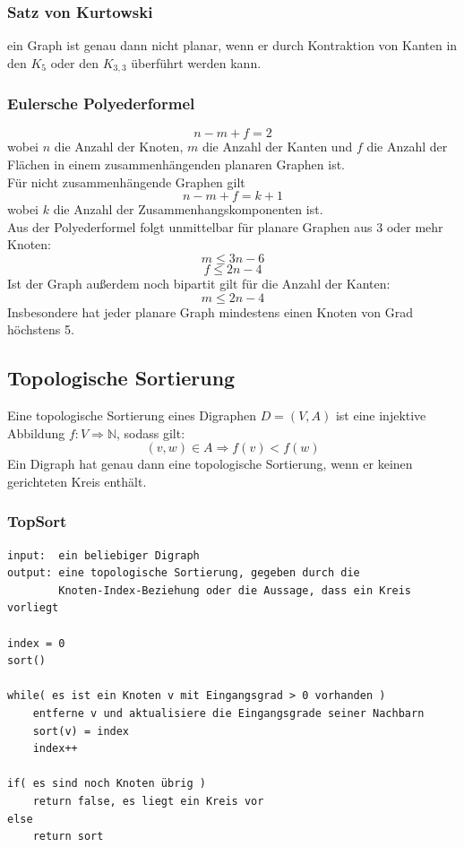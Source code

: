 \documentclass[10pt,a4paper,landscape]{article}
\begin{document}
\begin{multicols*}{2}
    \subsubsection*{ Satz von Kurtowski } ein Graph ist genau dann nicht planar, wenn er durch Kontraktion von Kanten 
    in den $K_5$ oder den $K_{3,3}$ überführt werden kann.
    \subsubsection*{ Eulersche Polyederformel }
    \[ n - m + f = 2 \]
    wobei $n$ die Anzahl der Knoten, $m$ die Anzahl der Kanten und $f$ die Anzahl der Flächen in einem 
    zusammenhängenden planaren Graphen ist. \\
    Für nicht zusammenhängende Graphen gilt
    \[ n - m + f = k + 1 \]
    wobei $k$ die Anzahl der Zusammenhangskomponenten ist. \\
    Aus der Polyederformel folgt unmittelbar für planare Graphen aus 3 oder mehr Knoten:
    \[ m \leq 3n - 6 \]
    \[ f \leq 2n - 4 \]
    Ist der Graph außerdem noch bipartit gilt für die Anzahl der Kanten:
    \[ m \leq 2n - 4 \]
    Insbesondere hat jeder planare Graph mindestens einen Knoten von Grad höchstens 5.

    \subsection{ Topologische Sortierung }
    Eine topologische Sortierung eines Digraphen $D = (V,A)$ ist eine injektive Abbildung 
    $f:V\Rightarrow \mathbb{N}$, sodass gilt:
    \[ (v,w)\in A \Rightarrow f(v) < f(w) \]
    Ein Digraph hat genau dann eine topologische Sortierung, wenn er keinen gerichteten Kreis enthält.
    \newpage
    \subsubsection*{ TopSort }
    \begin{verbatim}
input:  ein beliebiger Digraph
output: eine topologische Sortierung, gegeben durch die 
        Knoten-Index-Beziehung oder die Aussage, dass ein Kreis vorliegt

index = 0
sort()

while( es ist ein Knoten v mit Eingangsgrad > 0 vorhanden )
    entferne v und aktualisiere die Eingangsgrade seiner Nachbarn
    sort(v) = index
    index++

if( es sind noch Knoten übrig )
    return false, es liegt ein Kreis vor
else 
    return sort
    \end{verbatim}


\end{multicols*}
\end{document}
